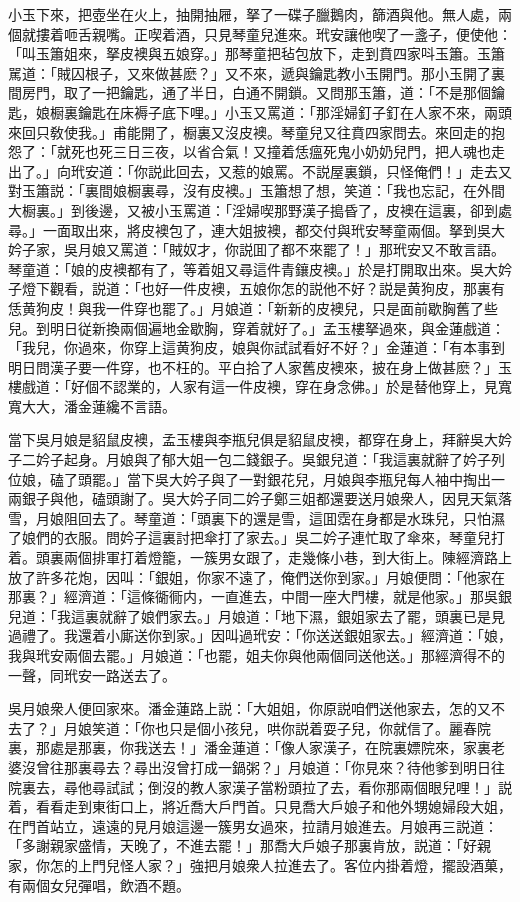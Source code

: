 小玉下來，把壺坐在火上，抽開抽屜，拏了一碟子臘鵝肉，篩酒與他。無人處，兩個就摟着咂舌親嘴。正喫着酒，只見琴童兒進來。玳安讓他喫了一盞子，便使他：「叫玉簫姐來，拏皮襖與五娘穿。」那琴童把毡包放下，走到賁四家呌玉簫。玉簫駡道：「賊囚根子，又來做甚麽？」又不來，遞與鑰匙教小玉開門。那小玉開了裏間房門，取了一把鑰匙，通了半日，白通不開鎖。又問那玉簫，道：「不是那個鑰匙，娘橱裏鑰匙在床褥子底下哩。」小玉又罵道：「那淫婦釘子釘在人家不來，兩頭來回只敎使我。」甫能開了，橱裏又沒皮襖。琴童兒又往賁四家問去。來回走的抱怨了：「就死也死三日三夜，以省合氣！又撞着恁瘟死鬼小奶奶兒門，把人魂也走出了。」向玳安道：「你説此回去，又惹的娘罵。不説屋裏鎖，只怪俺們！」走去又對玉簫説：「裏間娘橱裏尋，沒有皮襖。」玉簫想了想，笑道：「我也忘記，在外間大橱裏。」到後邊，又被小玉罵道：「淫婦喫那野漢子搗昏了，皮襖在這裏，卻到處尋。」一面取出來，將皮襖包了，連大姐披襖，都交付與玳安琴童兩個。拏到吳大妗子家，吳月娘又罵道：「賊奴才，你説囬了都不來罷了！」那玳安又不敢言語。琴童道：「娘的皮襖都有了，等着姐又尋這件青鑲皮襖。」於是打開取出來。吳大妗子燈下觀看，説道：「也好一件皮襖，五娘你怎的説他不好？説是黄狗皮，那裏有恁黄狗皮！與我一件穿也罷了。」月娘道：「新新的皮襖兒，只是面前歇胸舊了些兒。到明日従新換兩個遍地金歇胸，穿着就好了。」孟玉樓拏過來，與金蓮戲道：「我兒，你過來，你穿上這黄狗皮，娘與你試試看好不好？」金蓮道：「有本事到明日問漢子要一件穿，也不枉的。平白拾了人家舊皮襖來，披在身上做甚麽？」玉樓戲道：「好個不認業的，人家有這一件皮襖，穿在身念佛。」於是替他穿上，見寬寬大大，潘金蓮纔不言語。

當下吳月娘是貂鼠皮襖，孟玉樓與李瓶兒俱是貂鼠皮襖，都穿在身上，拜辭吳大妗子二妗子起身。月娘與了郁大姐一包二錢銀子。吳銀兒道：「我這裏就辭了妗子列位娘，磕了頭罷。」當下吳大妗子與了一對銀花兒，月娘與李瓶兒每人袖中掏出一兩銀子與他，磕頭謝了。吳大妗子同二妗子鄭三姐都還要送月娘衆人，因見天氣落雪，月娘阻回去了。琴童道：「頭裏下的還是雪，這囬霑在身都是水珠兒，只怕濕了娘們的衣服。問妗子這裏討把傘打了家去。」吳二妗子連忙取了傘來，琴童兒打着。頭裏兩個排軍打着燈籠，一簇男女跟了，走幾條小巷，到大街上。陳經濟路上放了許多花炮，因叫：「銀姐，你家不遠了，俺們送你到家。」月娘便問：「他家在那裏？」經濟道：「這條衚衕内，一直進去，中間一座大門樓，就是他家。」那吳銀兒道：「我這裏就辭了娘們家去。」月娘道：「地下濕，銀姐家去了罷，頭裏已是見過禮了。我還着小廝送你到家。」因叫過玳安：「你送送銀姐家去。」經濟道：「娘，我與玳安兩個去罷。」月娘道：「也罷，姐夫你與他兩個同送他送。」那經濟得不的一聲，同玳安一路送去了。

吳月娘衆人便回家來。潘金蓮路上説：「大姐姐，你原説咱們送他家去，怎的又不去了？」月娘笑道：「你也只是個小孩兒，哄你説着耍子兒，你就信了。麗春院裏，那處是那裏，你我送去！」潘金蓮道：「像人家漢子，在院裏嫖院來，家裏老婆沒曾往那裏尋去？尋出沒曾打成一鍋粥？」月娘道：「你見來？待他爹到明日往院裏去，尋他尋試試；倒沒的教人家漢子當粉頭拉了去，看你那兩個眼兒哩！」説着，看看走到東街口上，將近喬大戶門首。只見喬大戶娘子和他外甥媳婦段大姐，在門首站立，遠遠的見月娘這邊一簇男女過來，拉請月娘進去。月娘再三説道：「多謝親家盛情，天晚了，不進去罷！」那喬大戶娘子那裏肯放，説道：「好親家，你怎的上門兒怪人家？」強把月娘衆人拉進去了。客位内掛着燈，擺設酒菓，有兩個女兒彈唱，飲酒不題。

